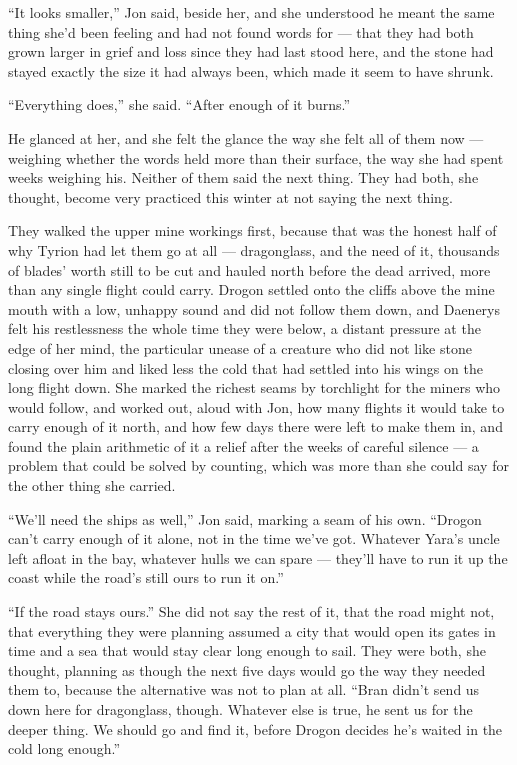 “It looks smaller,” Jon said, beside her, and she understood he meant the same thing she’d been feeling and had not found words for — that they had both grown larger in grief and loss since they had last stood here, and the stone had stayed exactly the size it had always been, which made it seem to have shrunk.

“Everything does,” she said. “After enough of it burns.”

He glanced at her, and she felt the glance the way she felt all of them now — weighing whether the words held more than their surface, the way she had spent weeks weighing his. Neither of them said the next thing. They had both, she thought, become very practiced this winter at not saying the next thing.

They walked the upper mine workings first, because that was the honest half of why Tyrion had let them go at all — dragonglass, and the need of it, thousands of blades’ worth still to be cut and hauled north before the dead arrived, more than any single flight could carry. Drogon settled onto the cliffs above the mine mouth with a low, unhappy sound and did not follow them down, and Daenerys felt his restlessness the whole time they were below, a distant pressure at the edge of her mind, the particular unease of a creature who did not like stone closing over him and liked less the cold that had settled into his wings on the long flight down. She marked the richest seams by torchlight for the miners who would follow, and worked out, aloud with Jon, how many flights it would take to carry enough of it north, and how few days there were left to make them in, and found the plain arithmetic of it a relief after the weeks of careful silence — a problem that could be solved by counting, which was more than she could say for the other thing she carried.

“We’ll need the ships as well,” Jon said, marking a seam of his own. “Drogon can’t carry enough of it alone, not in the time we’ve got. Whatever Yara’s uncle left afloat in the bay, whatever hulls we can spare — they’ll have to run it up the coast while the road’s still ours to run it on.”

“If the road stays ours.” She did not say the rest of it, that the road might not, that everything they were planning assumed a city that would open its gates in time and a sea that would stay clear long enough to sail. They were both, she thought, planning as though the next five days would go the way they needed them to, because the alternative was not to plan at all. “Bran didn’t send us down here for dragonglass, though. Whatever else is true, he sent us for the deeper thing. We should go and find it, before Drogon decides he’s waited in the cold long enough.”

